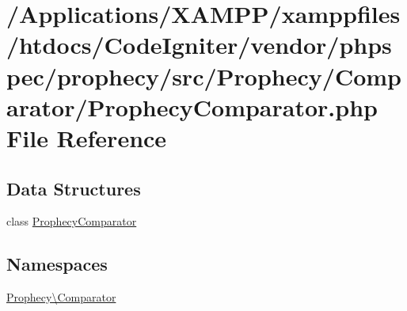 \hypertarget{_prophecy_comparator_8php}{}\section{/\+Applications/\+X\+A\+M\+P\+P/xamppfiles/htdocs/\+Code\+Igniter/vendor/phpspec/prophecy/src/\+Prophecy/\+Comparator/\+Prophecy\+Comparator.php File Reference}
\label{_prophecy_comparator_8php}
\subsection*{Data Structures}
\begin{DoxyCompactItemize}
\item 
class \mbox{\hyperlink{class_prophecy_1_1_comparator_1_1_prophecy_comparator}{Prophecy\+Comparator}}
\end{DoxyCompactItemize}
\subsection*{Namespaces}
\begin{DoxyCompactItemize}
\item 
 \mbox{\hyperlink{namespace_prophecy_1_1_comparator}{Prophecy\textbackslash{}\+Comparator}}
\end{DoxyCompactItemize}
